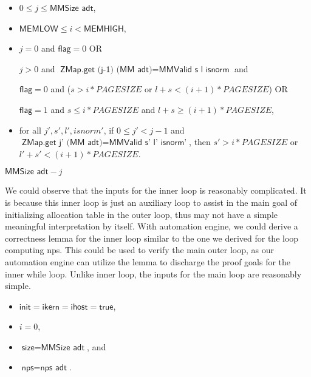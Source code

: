 \begin{definition}
\begin{itemize}
\item $0\le j \le \textsf{MMSize adt}$,
\item $\textsf{MEMLOW}\le i < \textsf{MEMHIGH}$,
\item $j=0$ and $\textsf{flag}=0$      OR

$j>0$ and $\textsf{ZMap.get (j-1) (MM adt)} = \textsf{MMValid s l isnorm}$ and

\hspace{10mm}$\textsf{flag}=0$ and ($s > i * PAGESIZE$ or $l + s < (i + 1) * PAGESIZE$)      OR
	
\hspace{10mm}$\textsf{flag}=1$ and $s \le i * PAGESIZE$ and $l + s \geq (i + 1) * PAGESIZE$,

\item for all $j', s', l', isnorm'$, if $0\le j' < j - 1$ and $\textsf{ZMap.get j' (MM adt)} = \textsf{MMValid s' l' isnorm'}$, then
$s' > i * PAGESIZE$ or $l' + s' < (i + 1) * PAGESIZE$.
\end{itemize}
\end{definition}

\begin{definition}
$\textsf{MMSize adt}-j$
\end{definition}

We could observe that the inputs for the inner loop is reasonably complicated. It is because
this inner loop is just an auxiliary loop to assist in the main goal of initializing allocation table
in the outer loop, thus may not have a simple meaningful interpretation by itself.
With automation engine, we could derive a correctness lemma for the inner loop similar to the one
we derived for the loop computing \textsf{nps}. This could be used to verify the main outer loop,
as our automation engine can utilize the lemma to discharge the proof goals for the inner while loop.
Unlike inner loop, the inputs for the main loop are reasonably simple.

\begin{definition}[Precondition] 
\begin{itemize}
\item $\textsf{init} = \textsf{ikern} = \textsf{ihost} = \textsf{true}$,
\item $i=0$, 
\item $\textsf{size}=\textsf{MMSize adt}$, and
\item $\textsf{nps}=\textsf{nps adt}$.
\end{itemize}
\end{definition}


